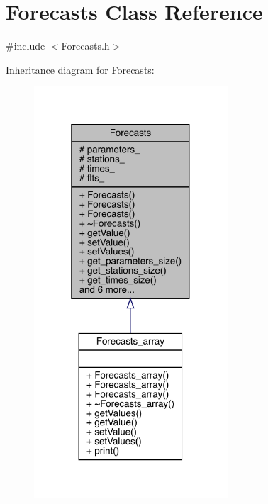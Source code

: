 \hypertarget{class_forecasts}{}\section{Forecasts Class Reference}
\label{class_forecasts}


{\ttfamily \#include $<$Forecasts.\+h$>$}



Inheritance diagram for Forecasts\+:
\nopagebreak
\begin{figure}[H]
\begin{center}
\leavevmode
\includegraphics[width=205pt]{class_forecasts__inherit__graph}
\end{center}
\end{figure}


